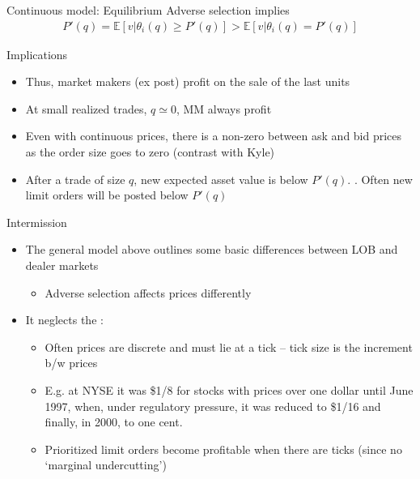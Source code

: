 \documentclass[english,10pt]{beamer}
\begin{document}
\begin{frame}{Continuous model: Equilibrium}
	Adverse selection implies
	\begin{align}
	P'(q) = \mathbb{E}[v|\theta_i(q) \geq P'(q)] > \mathbb{E}[v|\theta_i(q) = P'(q)]
	\end{align}
	\begin{block}{Implications}
		\begin{itemize}
			\item Thus, market makers (ex post) profit on the sale of the last units
			\item At small realized trades, $q \simeq 0$, MM always profit
			\item Even with continuous prices, there is a non-zero  between ask and bid prices as the order size goes to zero (contrast with Kyle)
			\item After a trade of size $q$, new expected asset value is below $P'(q)$. \pause {}. Often new limit orders will be posted below $P'(q)$
		\end{itemize}
	\end{block}
\end{frame}


\begin{frame}{Intermission}
	\begin{itemize}
		\item The general model above outlines some basic differences between LOB and dealer markets
		\begin{itemize}
			\item Adverse selection affects prices differently
		\end{itemize}
		\item It neglects the :
		\begin{itemize}
			\item Often prices are discrete and must lie at a tick --  tick size is the increment b/w prices
			\item E.g. at NYSE it was \$1/8 for stocks with prices over one dollar until June 1997, when, under regulatory pressure, it was reduced to \$1/16 and finally, in 2000, to one cent.
			\item Prioritized limit orders become profitable when there are ticks (since no `marginal undercutting')
		\end{itemize}
	\end{itemize}
\end{frame}
\end{document}
